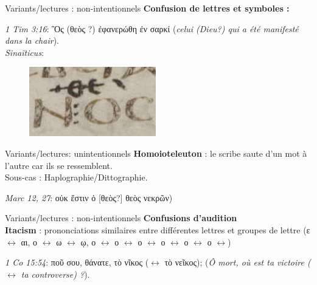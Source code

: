 \documentclass[11pt]{beamer}
\begin{document}
    \begin{frame}{Variants/lectures : non-intentionnels}
\textbf{Confusion de lettres et symboles :}
    \begin{block}{}
        \emph{1 Tim 3:16}:
        \textgreek{ Ὃς (\textgreek{θεὸς ?}) ἐφανερώθη ἐν σαρκί} (\textit{celui (Dieu?) qui a été manifesté dans la chair}).\\
        \textit{Sinaïticus}:
        \begin{figure}
            \centering
            \includegraphics[width=0.3\linewidth]{img/1Tim316.png}
        \end{figure}
    \end{block}
    \end{frame}
    \begin{frame}{Variants/lectures: unintentionnels}
        \textbf{Homoioteleuton} : le scribe saute d'un mot à l'autre car ils se ressemblent. \\
        Sous-cas : Haplographie/Dittographie.\\
        \begin{block}{}
        \emph{Marc 12, 27}: \textgreek{οὐκ ἔστιν ὁ  [θεὸς?] θεὸς νεκρῶν})
        \end{block}

\end{frame}

\begin{frame}{Variants/lectures : non-intentionnels}
\textbf{Confusions d'audition}\\

\textbf{Itacism} : prononciations similaires entre différentes lettres et groupes de lettre (\textgreek{ε} $\leftrightarrow$ \textgreek{αι}, \textgreek{ο} $\leftrightarrow$  \textgreek{ω} $\leftrightarrow$  \textgreek{ῳ}, \textgreek{ο} $\leftrightarrow$ \textgreek{ο} $\leftrightarrow$ \textgreek{ο} $\leftrightarrow$ \textgreek{ο} $\leftrightarrow$ \textgreek{ο} $\leftrightarrow$ \textgreek{ο} $\leftrightarrow$)

\begin{block}{}
   \emph{1 Co 15:54}: \textgreek{ποῦ σου, θάνατε, τὸ νῖκος ($\leftrightarrow$ τὸ νεῖκος);} (\textit{Ô mort, où est ta victoire ($\leftrightarrow$ ta controverse) ?}).
\end{block}
    
\end{frame}
\end{document}
